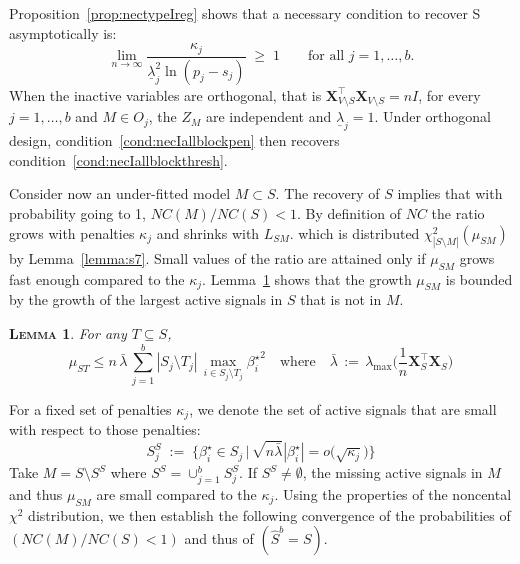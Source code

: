 \documentclass[aos]{imsart}
\theoremstyle{plain}
\newtheorem{lem}{\textsc{Lemma}}[section]
\newcommand{\bs}{\boldsymbol}
\begin{document}
Proposition~\ref{prop:nectypeIreg} shows that 
a necessary condition to recover S asymptotically %
is: 
\begin{equation}\label{cond:necIallblockpen}
\lim_{n\to\infty}\frac{\kappa_j}{\underline{\lambda}_j^2\ln(p_j-s_j)}\;\geq\;1\qquad\mbox{for all }j=1,\ldots,b.
\end{equation}
When the inactive variables are orthogonal, that is $\bs X_{V\setminus S}^{\top}\bs X_{V\setminus S}=nI$, for every $j=1,\ldots,b$ and $M\in O_j$, the $Z_M$ are independent and $\underline{\lambda}_j=1$. Under orthogonal design, condition~\eqref{cond:necIallblockpen} then recovers condition~\eqref{cond:necIallblockthresh}.

Consider now an under-fitted model $M\subset S$. The recovery of $S$ implies that with probability going to 1, $NC(M)/NC(S)<1$. By definition of $NC$ the ratio grows with penalties $\kappa_j$ and shrinks with $L_{SM}$. which is distributed $\chi^2_{|S\setminus M|}(\mu_{SM})$ by Lemma~\ref{lemma:s7}. Small values of the ratio are attained only if $\mu_{SM}$ grows fast enough compared to the $\kappa_j$. Lemma~\ref{lem:upperboundnoncentral} shows that the growth $\mu_{SM}$ is bounded by the growth of the largest active signals in $S$ that is not in $M$.
\begin{lem}\label{lem:upperboundnoncentral}
    For any $T\subseteq S$, $$\mu_{ST} \leq n\,\bar{\lambda}\,\sum_{j=1}^b|S_j\setminus T_j|\,\max_{i\in S_j\setminus T_j}{\beta_{i}^{\star}}^2 \quad \text{where}\quad \bar{\lambda}\,:=\,\lambda_{\max}\Big(\frac1n \bs X_{S}^\top\bs X_{S}\Big)$$
\end{lem}

For a fixed set of penalties $\kappa_j$, we denote the set of active signals that are small with respect to those penalties: 
\begin{equation}\label{eq:defss}
    S_j^{S}\;:=\;\Bigg\{\beta_i^{\star} \in S_j \,\Big|\,\sqrt{n\bar{\lambda}}|\beta_{i}^{\star}|=o\big(\sqrt{\kappa_j}\big) \Bigg\}
\end{equation}
Take $M=S\setminus S^S$ where $S^S=\cup_{j=1}^b S_j^S$. If $S^S\neq \emptyset$, the missing active signals in $M$ and thus $\mu_{SM}$ are small compared to the $\kappa_j$. Using the properties of the noncental $\chi^2$ distribution, we then establish the following convergence of the probabilities of $(NC(M)/NC(S)<1)$ and thus of $(\hat{S}^{b}=S)$.
\end{document}

